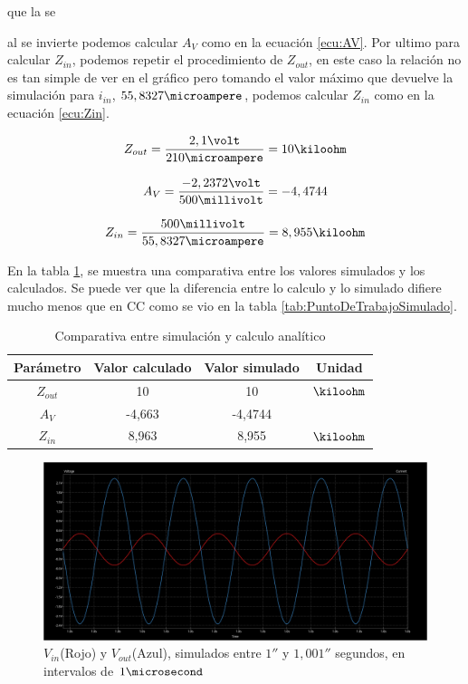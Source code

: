 \documentclass[12pt,letterpaper]{article}     %
\begin{document}
que la se{al se invierte podemos calcular $A_V$
como en la ecuación \ref{ecu:AV}.
Por ultimo para calcular $Z_{in}$, podemos repetir el procedimiento
de $Z_{out}$, en este caso la relación no es tan simple de ver en el gráfico
pero tomando el valor máximo que devuelve la simulación para $i_{in}$, 
$55,8327\microampere$, podemos calcular $Z_{in}$ como en la ecuación \ref{ecu:Zin}.

\begin{equation}
	Z_{out}=
	\frac{
		2,1\volt
	}{
		210\microampere
	}=
	10\kiloohm
\label{ecu:Zout}
\end{equation}

\begin{equation}
	A_V=
	\frac{
		-2,2372\volt
	}{
		500\millivolt
	}=
	-4,4744
\label{ecu:AV}
\end{equation}

\begin{equation}
	Z_{in}=
	\frac{
		500\millivolt
	}{
		55,8327\microampere
	}=
	8,955\kiloohm
\label{ecu:Zin}
\end{equation}

En la tabla \ref{tab:CASimulado}, se muestra una comparativa entre los valores simulados y los calculados.
Se puede ver que la diferencia entre lo calculo y lo simulado difiere mucho menos que en CC como se vio en
la tabla \ref{tab:PuntoDeTrabajoSimulado}.

\begin{table}[!ht]
	\begin{center}
		\begin{tabular}{| c | c | c | c |}
			\hline
			\textbf{Parámetro} & \textbf{Valor calculado} & \textbf{Valor simulado} & \textbf{Unidad}\\ 
			\hline
			{$Z_{out}$} & {10} & {10} & {$\kiloohm$} \\
			\hline
			{$A_V$} & {-4,663} & {-4,4744} & {} \\
			\hline
			{$Z_{in}$} & {8,963} & {8,955} & {$\kiloohm$}\\
			\hline
		\end{tabular}
	\end{center}
	\caption{Comparativa entre simulación y calculo analítico}
\label{tab:CASimulado}
\end{table}

\begin{figure}[!ht]
\centering
\includegraphics[scale=0.3]{imagenes/SimulacionCA.png}
\caption{$V_{in}$(Rojo) y $V_{out}$(Azul), simulados entre $1\second$ y $1,001\second$ segundos, en intervalos de $1\microsecond$}
\label{fig:SimulacionCA}
\end{figure}

}
\end{document}
